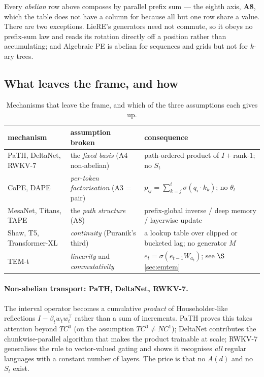 \documentclass[11pt]{article}
\begin{document}
\noindent Every \emph{abelian} row above composes by parallel prefix sum --- the
eighth axis, \textbf{A8}, which the table does not have a column for because all but
one row share a value. There are two exceptions. LieRE's generators need not
commute, so it obeys no prefix-sum law and reads its rotation directly off a position
rather than accumulating; and Algebraic PE is abelian for sequences and grids but not
for $k$-ary trees.

\subsection{What leaves the frame, and how}
\label{sec:escape}

\begin{table}[htbp]\centering\small
\caption{Mechanisms that leave the frame, and which of the three assumptions each gives up.}
\label{tab:outofframe}
\begin{tabular}{@{}p{}p{}p{}@{}}
\toprule
mechanism & assumption broken & consequence \\
\midrule
PaTH, DeltaNet, RWKV-7 & the \emph{fixed basis} (A4 non-abelian)
  & path-ordered product of $I+\text{rank-}1$; no $S_t$ \\
CoPE, DAPE   & \emph{per-token factorisation} (A3 = pair)
  & $p_{ij}=\sum_{k=j}^{i}\sigma(q_i\!\cdot\!k_k)$; no $\theta_t$ \\
MesaNet, Titans, TAPE & the \emph{path structure} (A8)
  & prefix-global inverse / deep memory / layerwise update \\
Shaw, T5, Transformer-XL & \emph{continuity} (Puranik's third)
  & a lookup table over clipped or bucketed lag; no generator $M$ \\
TEM-t        & \emph{linearity} and \emph{commutativity}
  & $e_t = \sigma(e_{t-1}W_{a_t})$; see $\S$\ref{sec:emtem} \\
\bottomrule
\end{tabular}
\end{table}

\paragraph{Non-abelian transport: PaTH, DeltaNet, RWKV-7.} The interval operator
becomes a cumulative \emph{product} of Householder-like reflections
$I-\beta_t w_tw_t^{\!\top}$ rather than a sum of increments. PaTH proves this takes
attention beyond $TC^0$ (on the assumption $TC^0 \neq NC^1$); DeltaNet contributes the
chunkwise-parallel algorithm that makes the product trainable at scale; RWKV-7
generalises the rule to vector-valued gating and shows it recognises \emph{all}
regular languages with a constant number of layers. The price is that no $A(d)$ and no
$S_t$ exist.
\end{document}
